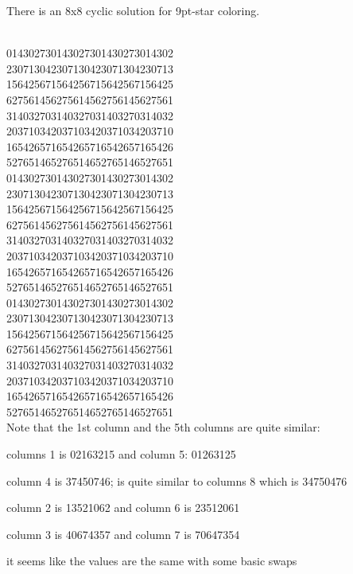 \documentclass{article}
\newcommand{\highlightsol}[1]{{\color{blue}#1}}
\begin{document}
There is an 8x8 cyclic solution for 9pt-star coloring.

~\\
014302730143027301430273014302\\
230713042307130423071304230713\\
156425671564256715642567156425\\
627561456275614562756145627561\\
314032703140327031403270314032\\
203710342037103420371034203710\\
165426571654265716542657165426\\
527651465276514652765146527651\\
01430273\highlightsol{01430273}01430273014302\\
23071304\highlightsol{23071304}23071304230713\\
15642567\highlightsol{15642567}15642567156425\\
62756145\highlightsol{62756145}62756145627561\\
31403270\highlightsol{31403270}31403270314032\\
20371034\highlightsol{20371034}20371034203710\\
16542657\highlightsol{16542657}16542657165426\\
52765146\highlightsol{52765146}52765146527651\\
014302730143027301430273014302\\
230713042307130423071304230713\\
156425671564256715642567156425\\
627561456275614562756145627561\\
314032703140327031403270314032\\
203710342037103420371034203710\\
165426571654265716542657165426\\
527651465276514652765146527651\\

Note that the 1st column and the 5th columns are quite similar:

columns 1 is 02163215 and column 5: 01263125

column 4 is 37450746; is quite similar to columns 8 which is 34750476

column 2 is 13521062 and column 6 is 23512061

column 3 is 40674357 and column 7 is 70647354

it seems like the values are the same with some basic swaps
\end{document}
